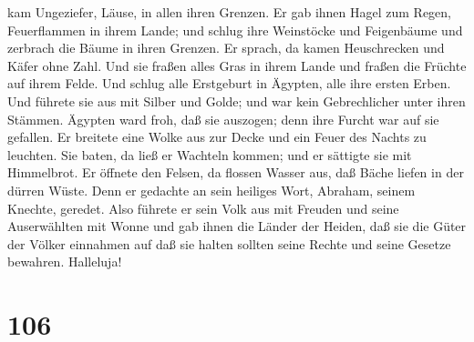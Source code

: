 kam Ungeziefer, Läuse, in allen ihren Grenzen.  Er gab
ihnen Hagel zum Regen, Feuerflammen in ihrem Lande;  und
schlug ihre Weinstöcke und Feigenbäume und zerbrach die Bäume in ihren
Grenzen.  Er sprach, da kamen Heuschrecken und Käfer ohne
Zahl.  Und sie fraßen alles Gras in ihrem Lande und fraßen
die Früchte auf ihrem Felde.  Und schlug alle Erstgeburt in
Ägypten, alle ihre ersten Erben.  Und führete sie aus mit
Silber und Golde; und war kein Gebrechlicher unter ihren Stämmen.
 Ägypten ward froh, daß sie auszogen; denn ihre Furcht war
auf sie gefallen.  Er breitete eine Wolke aus zur Decke und
ein Feuer des Nachts zu leuchten.  Sie baten, da ließ er
Wachteln kommen; und er sättigte sie mit Himmelbrot.  Er
öffnete den Felsen, da flossen Wasser aus, daß Bäche liefen in der
dürren Wüste.  Denn er gedachte an sein heiliges Wort,
Abraham, seinem Knechte, geredet.  Also führete er sein
Volk aus mit Freuden und seine Auserwählten mit Wonne  und
gab ihnen die Länder der Heiden, daß sie die Güter der Völker einnahmen
 auf daß sie halten sollten seine Rechte und seine Gesetze
bewahren. Halleluja!

\hypertarget{section-105}{%
\section{106}\label{section-105}}

